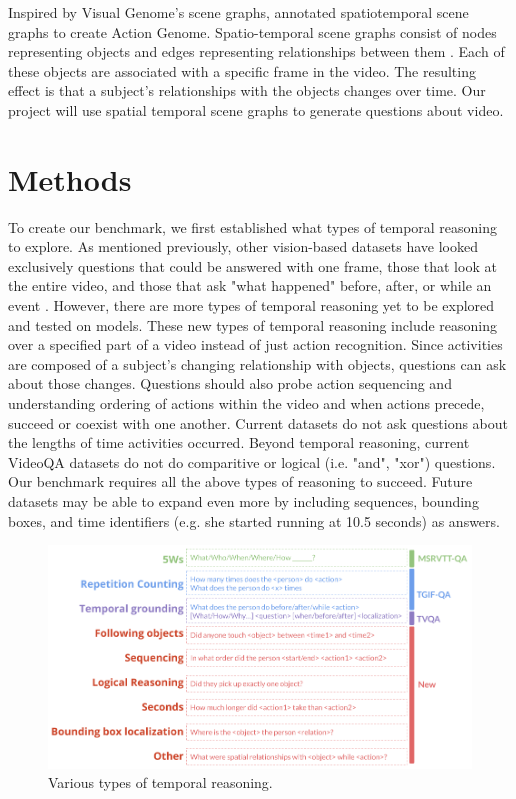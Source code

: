 \documentclass[10pt,twocolumn,letterpaper]{article}
\newcommand{\mgm}[1]{{\color{cyan}{mgm: #1}}}
\begin{document}
Inspired by Visual Genome's scene graphs, \cite{ji2020action} annotated spatiotemporal scene graphs to create Action Genome. Spatio-temporal scene graphs consist of nodes representing objects and edges representing relationships between them \mgm{(add in that these relationships are 3 categories?)}. Each of these objects are associated with a specific frame in the video. The resulting effect is that a subject's relationships with the objects changes over time. Our project will use spatial temporal scene graphs to generate questions about video. 

\section{Methods}

To create our benchmark, we first established what types of temporal reasoning to explore. As mentioned previously, other vision-based datasets have looked exclusively questions that could be answered with one frame, those that look at the entire video, and those that ask "what happened" before, after, or while an event  \cite{tapaswi2016movieqa, lei2018tvqa, jang2017tgif, kim2017deepstory, xu2017video, maharaj2017dataset, zeng2016leveraging, yu2019activitynet}. However, there are more types of temporal reasoning yet to be explored and tested on models. These new types of temporal reasoning include reasoning over a specified part of a video instead of just action recognition. \mgm{rewrite sentence} Since activities are composed of a subject's changing relationship with objects, questions can ask about those changes. Questions should also probe action sequencing and understanding ordering of actions within the video and when actions precede, succeed or coexist with one another. Current datasets do not ask questions about the lengths of time activities occurred. Beyond temporal reasoning, current VideoQA datasets do not do comparitive or logical (i.e. "and", "xor") questions. Our benchmark requires all the above types of reasoning to succeed. Future datasets may be able to expand even more by including sequences, bounding boxes, and time identifiers (e.g. she started running at 10.5 seconds) as answers.\mgm{I think make this a bullet list. Too weird for transition words}


\begin{figure}[t]
\begin{center}
\includegraphics[width=0.8\linewidth]{figure_reasoning.png}
\end{center}
   \caption{Various types of temporal reasoning.}
\label{fig:long}
\label{fig:onecol}
\end{figure}
\end{document}
